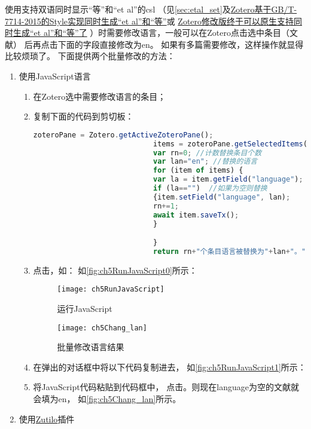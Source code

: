 \documentclass[cn,11pt,chinese]{elegantbook}
\begin{document}
		使用支持双语同时显示“等”和“et al”的csl
		（见\cref{sec:etal_set}及\href{https://zhuanlan.zhihu.com/p/320253145}
		{Zotero基于GB/T-7714-2015的Style实现同时生成“et al”和“等”}或
		\href{https://zhuanlan.zhihu.com/p/314928204}
		{Zotero修改版终于可以原生支持同时生成“et al”和“等”了}
		）时需要修改语言，一般可以在Zotero点击选中条目（文献）
		后再点击下面的字段直接修改为en。
		如果有多篇需要修改，这样操作就显得比较烦琐了。
		下面提供两个批量修改的方法：
		\begin{enumerate}
			\item 使用JavaScript语言
			  \begin{enumerate}[(1)]
				  \item 在Zotero选中需要修改语言的条目；
				  \item 复制下面的代码到剪切板：
						\begin{lstlisting}[language=JavaScript]
							zoteroPane = Zotero.getActiveZoteroPane();
							items = zoteroPane.getSelectedItems();
							var rn=0; //计数替换条目个数
							var lan="en"; //替换的语言
							for (item of items) {
							var la = item.getField("language");
							if (la=="")  //如果为空则替换
							{item.setField("language", lan);
							rn+=1;
							await item.saveTx();
							}

							}
							return rn+"个条目语言被替换为"+lan+"。"
				        \end{lstlisting}
					\item 点击，如：
					如\autoref{fig:ch5RunJavaScript0}所示：

						\begin{figure}[htbp]
							\centering
							\texttt{[image: ch5RunJavaScript]}
							\caption{运行JavaScript}
							\label{fig:ch5RunJavaScript0}
						\end{figure}
						\begin{figure}[htbp]
							\centering
							\texttt{[image: ch5Chang\_lan]}
							\caption{批量修改语言结果}
							\label{fig:ch5Chang_lan}
						\end{figure}
				\item 在弹出的对话框中将以下代码复制进去，
				如\autoref{fig:ch5RunJavaScript1}所示：
				\item 将JavaScript代码粘贴到代码框中，
					点击。则现在language为空的文献就会填为en，
					如\autoref{fig:ch5Chang_lan}所示。
			  \end{enumerate}
			\item 使用\href{https://github.com/wshanks/Zutilo/releases}{Zutilo}插件
			

\end{enumerate}
\end{document}
